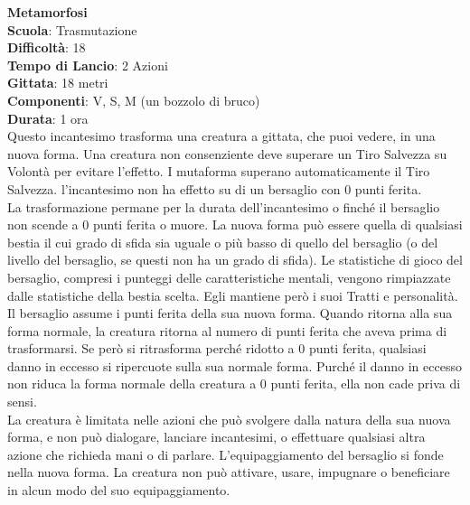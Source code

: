 \begin{multicols}{2}
\medskip\textbf{Metamorfosi}\\
\textbf{Scuola}: Trasmutazione\\
\textbf{Difficoltà}:  18\\
\textbf{Tempo di Lancio}: 2 Azioni\\
\textbf{Gittata}: 18 metri\\
\textbf{Componenti}: V, S, M (un bozzolo di bruco)\\
\textbf{Durata}: 1 ora \\
Questo incantesimo trasforma una creatura a gittata, che puoi vedere, in una nuova forma. Una creatura non consenziente deve superare un Tiro Salvezza su Volontà per evitare l’effetto. I mutaforma superano automaticamente il Tiro Salvezza. l'incantesimo non ha effetto su di un bersaglio con 0 punti ferita. \\
La trasformazione permane per la durata dell'incantesimo o finché il bersaglio non scende a 0 punti ferita o muore. La nuova forma può essere quella di qualsiasi bestia il cui grado di sfida sia uguale o più basso di quello del bersaglio (o del livello del bersaglio, se questi non ha un grado di sfida). Le statistiche di gioco del bersaglio, compresi i punteggi delle caratteristiche mentali, vengono rimpiazzate dalle  statistiche della bestia scelta. Egli mantiene però i suoi Tratti e personalità.\\
Il bersaglio assume i punti ferita della sua nuova forma. Quando ritorna alla sua forma normale, la creatura ritorna al numero di punti ferita che aveva prima di trasformarsi. Se però si ritrasforma perché ridotto a 0 punti ferita, qualsiasi danno in eccesso si ripercuote sulla sua normale forma. Purché il danno in eccesso non riduca la forma normale della creatura a 0 punti ferita, ella non cade priva di sensi.\\
La creatura è limitata nelle azioni che può svolgere dalla natura della sua nuova forma, e non può dialogare, lanciare incantesimi, o effettuare qualsiasi altra azione che richieda mani o di parlare. L’equipaggiamento del bersaglio si fonde nella nuova forma. La creatura non può attivare, usare, impugnare o beneficiare in alcun modo del suo equipaggiamento. 


\end{multicols}
